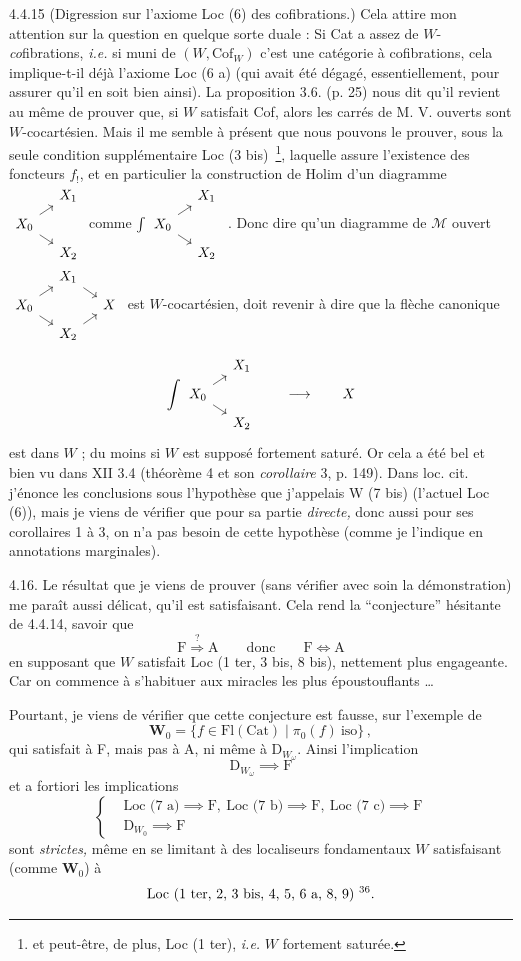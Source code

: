 \documentclass[11pt]{article}
\newcommand{\printedpage}[1]{\marginpar{\footnotesize p.~#1}}
\newcommand{\msp}[1]{\marginpar{\footnotesize [#1]}}
\newcommand{\fourche}{\begin{tikzcd}[ampersand replacement=\&, row sep=0.5em, column sep=1em, baseline=(\tikzcdmatrixname-2-1.base)]
 \& X_1 \\
 X_0 \arrow[ur] \arrow[dr] \& \\
 \& X_2
\end{tikzcd}}
\newcommand{\carre}{\begin{tikzcd}[ampersand replacement=\&, row sep=0.5em, column sep=1em, baseline=(\tikzcdmatrixname-2-1.base)]
 \& X_1 \arrow[dr] \& \\
 X_0 \arrow[ur] \arrow[dr] \& \& X \\
 \& X_2 \arrow[ur] \&
\end{tikzcd}}
\begin{document}
4.4.15 (Digression sur l'axiome Loc (6) des cofibrations.) Cela attire mon attention sur la question en quelque sorte duale : Si Cat a assez de $W$-\textit{co}fibrations, \textit{i.e.} si muni de $(W,\mathrm{Cof}_W)$ c'est une catégorie à cofibrations, cela implique-t-il déjà l'axiome Loc (6 a) (qui avait été dégagé, essentiellement, pour assurer qu'il en soit bien ainsi). La proposition 3.6. (p. 25) nous dit qu'il revient au même de prouver que, si $W$ satisfait Cof, alors les carrés de M. V. ouverts sont
\msp{page 67}%
$W$-cocartésien. Mais il me semble à présent que nous pouvons le prouver, sous la seule condition supplémentaire Loc (3 bis)~\footnote[35]{et peut-être, de plus, Loc (1 ter), \textit{i.e.} $W$ fortement saturée.}, laquelle assure l'existence des foncteurs $f_!$, et %
\printedpage{38}%
en particulier la construction de Holim d'un diagramme $\fourche$ \quad comme $\int\fourche$ \quad .
Donc dire qu'un diagramme de $\mathcal{M}$ ouvert $\carre$ est $W$-cocartésien, doit revenir à dire que la flèche canonique
\[
\int\fourche \qquad \longrightarrow \qquad X
\]
est dans $W$ ; du moins si $W$ est supposé fortement saturé. Or cela a été bel et bien vu dans XII 3.4 (théorème 4 et son \textit{corollaire} 3, p. 149). Dans loc. cit. j'énonce les conclusions sous l'hypothèse que j'appelais W (7 bis) (l'actuel Loc (6)), mais je viens de vérifier que pour sa partie \textit{directe,} donc aussi pour ses corollaires 1 à 3, on n'a pas besoin
\msp{page 68}%
de cette hypothèse (comme je l'indique en annotations marginales).

4.16. Le résultat que je viens de prouver (sans vérifier avec soin la démonstration) me paraît aussi délicat, qu'il est satisfaisant. Cela rend la “conjecture” hésitante de 4.4.14, savoir que
\[
\mathrm{F} \overset{?}{\Longrightarrow} \mathrm{A} \qquad \text{donc} \qquad \mathrm{F}\Longleftrightarrow\mathrm{A}
\]
en supposant que $W$ satisfait Loc (1 ter, 3 bis, 8 bis), nettement plus engageante. Car on commence à s'habituer aux miracles les plus époustouflants \ldots

Pourtant, je viens de vérifier que cette conjecture est fausse, sur l'exemple de
\[
\mathbf{W}_0=\{f\in\mathrm{Fl}(\mathrm{Cat})\mid\pi_0(f)\ \mathrm{iso}\}\,,
\]
qui satisfait à F, mais pas à A, ni même à $\mathrm{D}_{W_\omega}$. Ainsi l'implication
\[
\mathrm{D}_{W_\omega} \implies \mathrm{F}
\]
et a fortiori les implications
\[
\left\{
\begin{aligned}
&\text{Loc (7 a)} \implies \mathrm{F},\ \text{Loc (7 b)} \implies \mathrm{F},\ \text{Loc (7 c)} \implies \mathrm{F}\\
&\mathrm{D}_{W_0} \implies \mathrm{F}
\end{aligned}
\right.
\]
sont \textit{strictes,} même en se limitant à des localiseurs fondamentaux $W$ satisfaisant (comme $\mathbf{W}_0$) à
\[
\text{Loc (1 ter, 2, 3 bis, 4, 5, 6 a, 8, 9)}\ \text{\footnotemark[36]}.
\]
\end{document}
